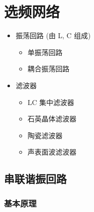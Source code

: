 \section{选频网络}

\begin{itemize}
    \item 振荡回路 (由 L, C 组成)
          \begin{itemize}
              \item 单振荡回路
              \item 耦合振荡回路
          \end{itemize}
    \item 滤波器
          \begin{itemize}
              \item LC 集中滤波器
              \item 石英晶体滤波器
              \item 陶瓷滤波器
              \item 声表面波滤波器
          \end{itemize}
\end{itemize}

\subsection{串联谐振回路}
\subsubsection{基本原理}

